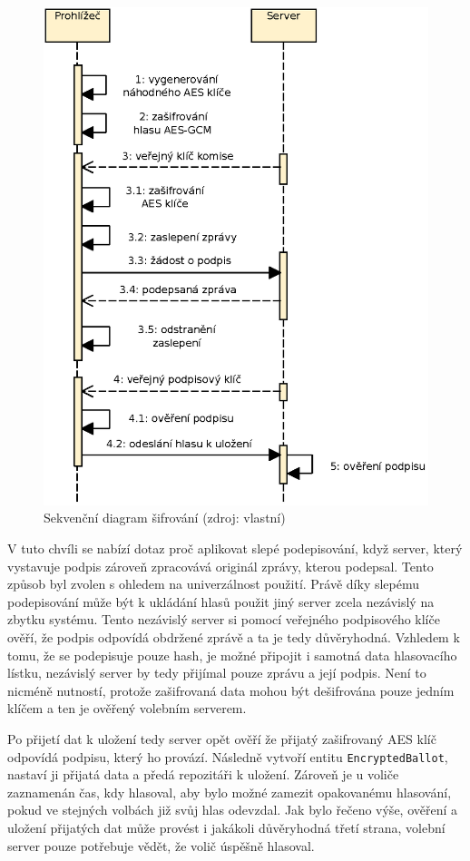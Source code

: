 \begin{figure}[h]
	\centering
	\includegraphics[width=0.8\linewidth]{svg/sifrovani.eps}
	\captionsetup{width=0.8\linewidth}
	\caption[Sekvenční diagram šifrování]{Sekvenční diagram šifrování (zdroj: vlastní)}
	\label{fig:diagramSifrovani}
\end{figure}


V tuto chvíli se nabízí dotaz proč aplikovat slepé podepisování, když server, který vystavuje podpis zároveň zpracovává originál zprávy, kterou podepsal. Tento způsob byl zvolen s ohledem na univerzálnost použití. Právě díky slepému podepisování může být k ukládání hlasů použit jiný server zcela nezávislý na zbytku systému. Tento nezávislý server si pomocí veřejného podpisového klíče ověří, že podpis odpovídá obdržené zprávě a ta je tedy důvěryhodná. Vzhledem k tomu, že se podepisuje pouze hash, je možné připojit i samotná data hlasovacího lístku, nezávislý server by tedy přijímal pouze zprávu a její podpis. Není to nicméně nutností, protože zašifrovaná data mohou být dešifrována pouze jedním klíčem a ten je ověřený volebním serverem.

Po přijetí dat k uložení tedy server opět ověří že přijatý zašifrovaný AES klíč odpovídá podpisu, který ho provází. Následně vytvoří entitu \texttt{EncryptedBallot}, nastaví ji přijatá data a předá repozitáři k uložení. Zároveň je u voliče zaznamenán čas, kdy hlasoval, aby bylo možné zamezit opakovanému hlasování, pokud ve stejných volbách již svůj hlas odevzdal. Jak bylo řečeno výše, ověření a uložení přijatých dat může provést i jakákoli důvěryhodná třetí strana, volební server pouze potřebuje vědět, že volič úspěšně hlasoval.

